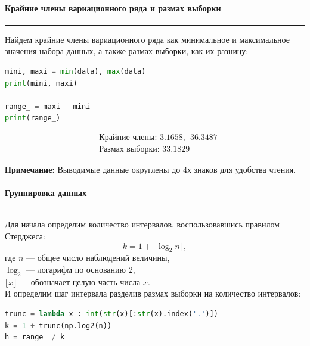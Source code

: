 \documentclass[a4paper, 14pt]{extarticle}
\begin{document}
\paragraph{Крайние члены вариационного ряда и размах выборки}\vspace{-20pt}\rule{\linewidth}{0.1mm}

Найдем крайние члены вариационного ряда как минимальное и максимальное значения 
набора данных, а также размах выборки, как их разницу:

\vspace{10pt}

\begin{lstlisting}[language=Python]
mini, maxi = min(data), max(data)
print(mini, maxi)

range_ = maxi - mini
print(range_)
\end{lstlisting}

\vspace{-5pt}

\begin{align*}
  & \text{Крайние члены: }  3.1658, \hspace{5pt} 36.3487 \\
  & \text{Размах выборки: }  33.1829
\end{align*}

{\footnotesize \textbf{Примечание:} Выводимые данные округлены до 4х знаков для удобства чтения.}

\newpage

\paragraph{Группировка данных}\vspace{-20pt}\rule{\linewidth}{0.1mm}

Для начала определим количество интервалов, воспользовавшись правилом
Стерджеса:
\begin{equation*}
    k = 1 + \lfloor \log_2 n \rfloor,
\end{equation*}
где $n$ — общее число наблюдений величины, \\ 
$\log_2$ — логарифм по основанию 2, \\
$\lfloor x \rfloor$ — обозначает целую часть числа $x$. \\

И определим шаг интервала разделив размах выборки на количество интервалов:

\vspace{10pt}

\begin{lstlisting}[language=Python]
trunc = lambda x : int(str(x)[:str(x).index('.')])
k = 1 + trunc(np.log2(n))
h = range_ / k
\end{lstlisting}
\end{document}
